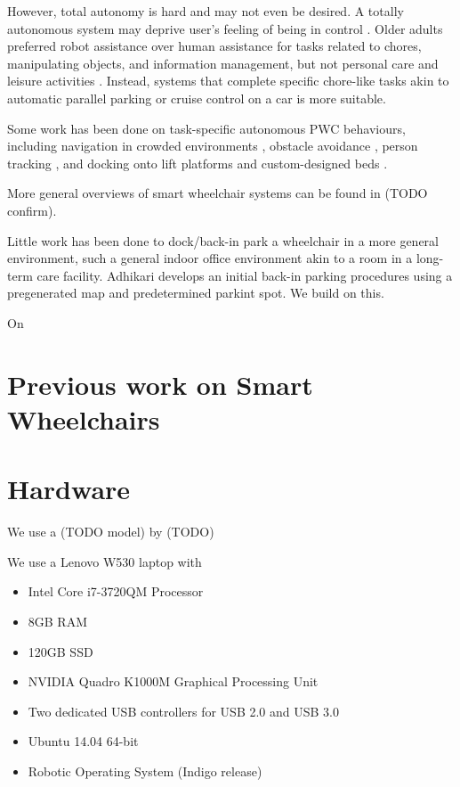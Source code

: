 However, total autonomy is hard and may not even be desired. 
A totally autonomous system may deprive user's feeling of being in control 
\cite{viswanathana2014wizard}.
Older adults preferred robot assistance over human assistance for tasks related
to chores, manipulating objects, and information management, but not personal
care and leisure activities \cite{smarr2014domestic}.
Instead, systems that complete specific chore-like tasks akin to automatic
parallel parking or cruise control on a car is more suitable.

Some work has been done on task-specific autonomous PWC behaviours, including
navigation in crowded environments \cite{prassler2001robotics}, obstacle
avoidance \cite{viswanathan2012navigation}, person tracking
\cite{leigh2015person}, and docking onto lift platforms
\cite{sermeno2006vision} and custom-designed beds \cite{ren2012docking}.

More general overviews of smart wheelchair systems can be found in
\cite{viswanathan2012navigation, simpson2005smart, faria2013patient} (TODO
confirm).

Little work has been done to dock/back-in park a wheelchair in a more general
environment, such a general indoor office environment akin to a room in a
long-term care facility. 
Adhikari \cite{adhikari2014single} develops an initial back-in parking
procedures using a pregenerated map and predetermined parkint spot. We build on
this.



On


\section{Previous work on Smart Wheelchairs}

\section{Hardware}
We use a (TODO model) by (TODO) 

We use a Lenovo W530 laptop with 
\begin{itemize}
\item Intel Core i7-3720QM Processor
\item 8GB RAM
\item 120GB SSD
\item NVIDIA Quadro K1000M Graphical Processing Unit
\item Two dedicated USB controllers for USB 2.0 and USB 3.0
\item Ubuntu 14.04 64-bit
\item Robotic Operating System (Indigo release)
\end{itemize}

